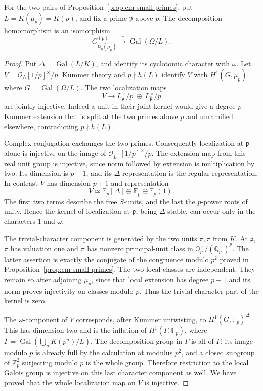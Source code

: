 \begin{proposition}\label{prop:cm-locality}
For the two pairs of Proposition~\ref{prop:cm-small-primes},
put \(L=K(\mu_p)=K(p)\), and fix a prime \(\mathfrak p\) above \(p\).
The decomposition homomorphism is an isomorphism
\[
 G_{\mathbb Q_p(\mu_p)}^{(p)}
    \xrightarrow{\ \sim\ }\operatorname{Gal}(\Omega/L).
\]
\end{proposition}
\begin{proof}
Put \(\Delta=\operatorname{Gal}(L/K)\), and identify its
cyclotomic character with \(\omega\). Let
\(V=\mathcal O_L[1/p]^\times/p\). Kummer theory and
\(p\nmid h(L)\) identify \(V\) with \(H^1(G,\mu_p)\),
where \(G=\operatorname{Gal}(\Omega/L)\).
The two localization maps
\[
 V\longrightarrow
 L_{\mathfrak p}^{\times}/p\ \oplus\
 L_{\bar{\mathfrak p}}^{\times}/p
\]
are jointly injective. Indeed a unit in their joint
kernel would give a degree-\(p\) Kummer extension that
is split at the two primes above \(p\) and unramified
elsewhere, contradicting \(p\nmid h(L)\).

Complex conjugation exchanges the two primes.
Consequently localization at \(\mathfrak p\) alone is
injective on the image of
\(\mathcal O_{L^+}[1/p]^\times/p\).
The extension map from this real unit group is injective,
since norm followed by extension is multiplication by two.
Its dimension is \(p-1\), and its \(\Delta\)-representation
is the regular representation. In contrast \(V\) has
dimension \(p+1\) and representation
\[
 V\simeq\mathbb F_p[\Delta]\oplus\mathbb F_p
                      \oplus\mathbb F_p(1).
\]
The first two terms describe the free \(S\)-units, and the
last the \(p\)-power roots of unity. Hence the kernel of
localization at \(\mathfrak p\), being \(\Delta\)-stable,
can occur only in the characters \(1\) and \(\omega\).

The trivial-character component is generated by the
two units \(\pi,\bar\pi\) from \(K\). At \(\mathfrak p\),
\(\pi\) has valuation one and \(\bar\pi\) has nonzero
principal-unit class in \(\mathbb Q_p^\times/
(\mathbb Q_p^\times)^p\). The latter assertion is exactly
the conjugate of the congruence modulo \(p^2\) proved in
Proposition~\ref{prop:cm-small-primes}. The two local
classes are independent. They remain so after adjoining
\(\mu_p\), since that local extension has degree \(p-1\)
and its norm proves injectivity on classes modulo \(p\).
Thus the trivial-character part of the kernel is zero.

The \(\omega\)-component of \(V\) corresponds, after
Kummer untwisting, to \(H^1(G,\mathbb F_p)^\Delta\).
This has dimension two and is the inflation of
\(H^1(\Gamma,\mathbb F_p)\), where
\(\Gamma=\operatorname{Gal}(\bigcup_nK(p^n)/L)\).
The decomposition group in \(\Gamma\) is all of \(\Gamma\):
its image modulo \(p\) is already full by the calculation
at modulus \(p^2\), and a closed subgroup of \(\mathbb Z_p^2\)
surjecting modulo \(p\) is the whole group. Therefore
restriction to the local Galois group is injective on
this last character component as well.
We have proved that the whole localization map on \(V\)
is injective.


\end{proof}
